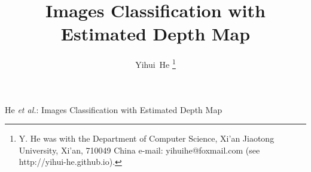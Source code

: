 \documentclass[journal]{IEEEtran}
\begin{document}
	\title{Images Classification with Estimated Depth Map}
	
	\author{Yihui~He%
		\thanks{Y. He was with the Department
			of Computer Science, Xi'an Jiaotong University, Xi'an,
			710049 China e-mail: yihuihe@foxmail.com (see http://yihui-he.github.io).}%
		}
	
	
	
	
	{He \MakeLowercase{\textit{et al.}}: Images Classification with Estimated Depth Map}
	
\end{document}
